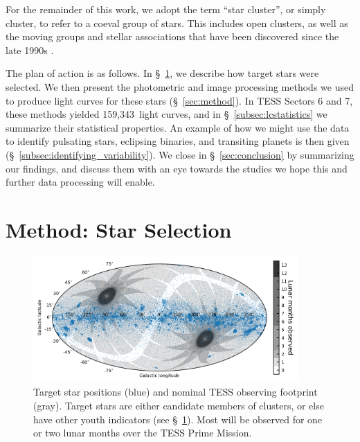 \documentclass[12pt,twocolumn,tighten]{aastex62}
\newcommand{\numberlcs}{159{,}343\ } %
\begin{document}
For the remainder of this work, we adopt the term ``star cluster'', or
simply cluster, to refer to a coeval group of stars.  This includes
open clusters, as well as the moving groups and stellar associations
that have been discovered since the late 1990s
\citep{zuckerman_young_2004}. 

The plan of action is as follows. In \S~\ref{sec:starselection}, we
describe how target stars were selected. We then present the
photometric and image processing methods we used to produce light
curves for these stars (\S~\ref{sec:method}).  In TESS Sectors 6 and
7, these methods yielded \numberlcs light curves, and in
\S~\ref{subsec:lcstatistics} we summarize their statistical properties.
An example of how we might use the data to identify pulsating stars,
eclipsing binaries, and transiting planets is then given
(\S~\ref{subsec:identifying_variability}).  We close in
\S~\ref{sec:conclusion} by summarizing our findings, and discuss them
with an eye towards the studies we hope this and further data
processing will enable.


\section{Method: Star Selection}
\label{sec:starselection}

\begin{figure}[!t]
	\begin{center}
		\leavevmode
		\includegraphics[width=0.9\textwidth]{target_star_positions.png}
	\end{center}
	\vspace{-0.5cm}
	\caption{
    Target star positions (blue) and nominal TESS observing
    footprint (gray).  Target stars are either candidate members of
    clusters, or else have other youth indicators (see
    \S~\ref{sec:starselection}).  Most will be observed for one or two
    lunar months over the TESS Prime Mission.
    \label{fig:cdips_targets_positions}
	}
\end{figure}
\end{document}
